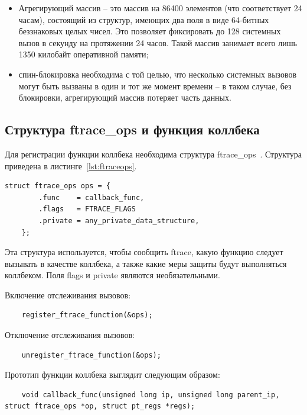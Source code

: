 \newpage

\begin{itemize}
	\item Агрегирующий массив -- это массив на 86400 элементов (что соответствует 24 часам), состоящий из структур, имеющих два поля в виде 64-битных беззнаковых целых чисел. Это позволяет фиксировать до 128 системных вызов в секунду на протяжении 24 часов. Такой массив занимает всего лишь 1350 килобайт оперативной памяти;
	
	\item спин-блокировка необходима с той целью, что несколько системных вызовов могут быть вызваны в один и тот же момент времени -- в таком случае, без блокировки, агрегирующий массив потеряет часть данных.
\end{itemize}

\subsection{Структура ftrace\_ops и функция коллбека}

Для регистрации функции коллбека необходима структура ftrace\_ops~\cite{ftrace_hook}. Структура приведена в листинге~\ref{lst:ftraceops}.

\begin{lstlisting}[label={lst:ftraceops}, caption={структура ftrace\_ops}]
	struct ftrace_ops ops = {
		.func    = callback_func,
		.flags   = FTRACE_FLAGS
		.private = any_private_data_structure,
	};
\end{lstlisting}

Эта структура используется, чтобы сообщить ftrace, какую функцию следует вызывать в качестве коллбека, а также какие меры защиты будут выполняться коллбеком. Поля flags и private являются необязательными.

Включение отслеживания вызовов:

\begin{lstlisting}
	register_ftrace_function(&ops);
\end{lstlisting}

Отключение отслеживания вызовов:

\begin{lstlisting}
	unregister_ftrace_function(&ops);
\end{lstlisting}

Прототип функции коллбека выглядит следующим образом:

\begin{lstlisting}
	void callback_func(unsigned long ip, unsigned long parent_ip, struct ftrace_ops *op, struct pt_regs *regs);
\end{lstlisting}

